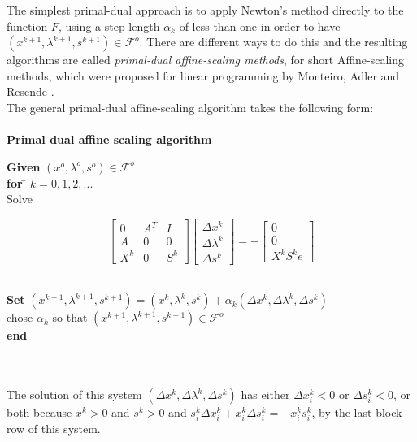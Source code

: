 \documentclass[a4paper,10 pt,titlepage,twoside]{book}
\theoremstyle{plain}
\theoremstyle{definition}
\theoremstyle{remark}
\begin{document}
The simplest primal-dual approach is to apply Newton's method directly to the function $F$, using a step length $\alpha_{k}$ of less than one in order to have $(x^{k+1},\lambda^{k+1},s^{k+1})\in \mathcal{F}^{o}$. There are different ways to do this and the resulting algorithms are called \textit{primal-dual affine-scaling methods}, for short Affine-scaling methods, which were proposed for linear programming by Monteiro,
Adler and Resende \cite{MARE}.\\ 
 The general primal-dual affine-scaling algorithm takes the following form:\\
\\ \textbf{Primal dual affine scaling  algorithm}
\begin{tabbing}
	\textbf{Given} $(x^{o}, \lambda^{o}, s^{o})\in\mathcal{F}^{o}$ \\
	\textbf{for} \= $k = 0, 1, 2,...$ \\
	\> Solve
\end{tabbing}
\begin{equation}\label{(AS)}
\begin{bmatrix}
0&A^{T}&I \\A&0&0\\X^{k}&0&S^{k}
\end{bmatrix}\begin{bmatrix}
\Delta x^{k}\\\Delta\lambda^{k} \\\Delta s^{k}
\end{bmatrix}=-\begin{bmatrix}
0\\0\\X^{k}S^{k}e
\end{bmatrix}
\end{equation}
\begin{tabbing}
	\\
	\textbf{Set} \=$(x^{k+1}, \lambda^{k+1}, s^{k+1}) = (x^{k}, \lambda^{k}, s^{k})+ \alpha_{k}(\Delta x^{k}, \Delta\lambda^{k}, \Delta s^{k})$
	\\
	\> chose $\alpha_{k}$ so that $(x^{k+1},\lambda^{k+1}, s^{k+1})\in\mathcal{F}^{o}$ \\
	\textbf{end}
\end{tabbing}
\\
\\
The solution of this system $\left(\Delta x^{k},\Delta\lambda^{k},\Delta s^{k}\right)$ has either $\Delta x_{i}^{k}<0$ or $\Delta s_{i}^{k}<0$, or both because $x^{k}>0$ and $s^{k}>0$ and $s^{k}_{i}\Delta x^{k}_{i} + x^{k}_{i}\Delta s^{k}_{i} = - x^{k}_{i}s^{k}_{i}$, by the last block row of this system.\\
\end{document}
